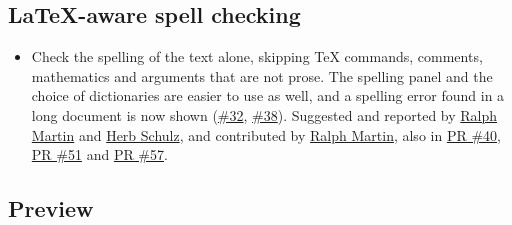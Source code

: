 \documentclass[11pt,letterpaper]{article}
\begin{document}
\subsection{LaTeX-aware spell checking}

\begin{itemize}
\item Check the spelling of the text alone, skipping TeX commands, comments, mathematics and arguments that are not prose. The spelling panel and the choice of dictionaries are easier to use as well, and a spelling error found in a long document is now shown (\href{https://github.com/TeXShopProject/TeXShop/issues/32}{\#32}, \href{https://github.com/TeXShopProject/TeXShop/issues/38}{\#38}). Suggested and reported by \href{https://github.com/ralphrmartin}{Ralph Martin} and \href{https://github.com/herbs}{Herb Schulz}, and contributed by \href{https://github.com/ralphrmartin}{Ralph Martin}, also in \href{https://github.com/TeXShopProject/TeXShop/pull/40}{PR \#40}, \href{https://github.com/TeXShopProject/TeXShop/pull/51}{PR \#51} and \href{https://github.com/TeXShopProject/TeXShop/pull/57}{PR \#57}.
\end{itemize}

\subsection{Preview}
\end{document}
